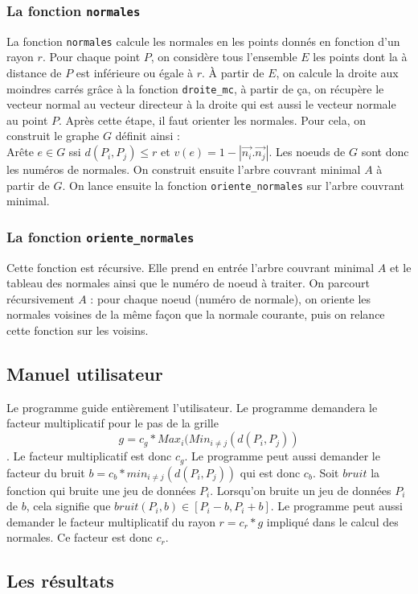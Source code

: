 \documentclass[11pt,a4paper]{article}
\begin{document}
\subsubsection{La fonction {\tt normales}}
La fonction {\tt normales} calcule les normales en les points donnés en fonction d'un rayon $r$. Pour chaque point $P$, on considère tous l'ensemble $E$
les points dont la à distance de $P$ est inférieure ou égale à $r$. À partir de $E$, on calcule la droite aux moindres carrés grâce à la fonction {\tt droite\_mc}, à partir
de ça, on récupère le vecteur normal au vecteur directeur à la droite qui est aussi le vecteur normale au point $P$. Après cette étape, il faut orienter les normales.
Pour cela, on construit le graphe $G$ définit ainsi : \\
Arête $e \in G $ ssi $d(P_i,P_j) \leq r$ et $v(e)=1-|\vec{n_i}.\vec{n_j}|$. Les noeuds de $G$ sont donc les numéros de normales.
On construit ensuite l'arbre couvrant minimal $A$ à partir de $G$. On lance ensuite la fonction {\tt oriente\_normales} sur l'arbre couvrant minimal.

\subsubsection{La fonction {\tt oriente\_normales}}
Cette fonction est récursive. Elle prend en entrée l'arbre couvrant minimal $A$ et le tableau des normales ainsi que le numéro de noeud à traiter.
On parcourt récursivement $A$ : pour chaque noeud (numéro de normale), on oriente les normales voisines de la même façon que la normale courante, puis on
relance cette fonction sur les voisins.

\subsection{Manuel utilisateur}
Le programme guide entièrement l'utilisateur. Le programme demandera le facteur multiplicatif pour le pas de la grille
$$g=c_g*Max_i(Min_{i \neq j}(d(P_i,P_j))$$. Le facteur multiplicatif est donc $c_g$.
Le programme peut aussi demander le facteur du bruit $b=c_b*min_{i \neq j}(d(P_i,P_j))$ qui est donc $c_b$. Soit $bruit$ la fonction
qui bruite une jeu de données $P_i$. Lorsqu'on bruite un jeu de données $P_i$ de $b$, cela signifie que $bruit(P_i,b) \in [P_i-b, P_i+b]$.
Le programme peut aussi demander le facteur multiplicatif du rayon $r=c_r*g$ impliqué dans le calcul des normales. Ce facteur est donc $c_r$.

\subsection{Les résultats}
\end{document}

